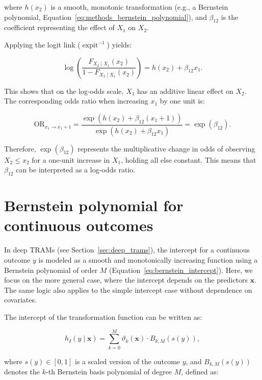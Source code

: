 where $h(x_2)$ is a smooth, monotonic transformation (e.g., a Bernstein polynomial, Equation~\ref{eq:methods_bernstein_polynomial}), and $\beta_{12}$ is the coefficient representing the effect of $X_1$ on $X_2$.

Applying the logit link ($\operatorname{expit}^{-1}$) yields:

\begin{equation*}
\log\left( \frac{F_{X_2 \mid X_1}(x_2)}{1 - F_{X_2 \mid X_1}(x_2)} \right)
= h(x_2) + \beta_{12} x_1.
\end{equation*}


This shows that on the log-odds scale, $X_1$ has an additive linear effect on $X_2$. The corresponding odds ratio when increasing $x_1$ by one unit is:

\begin{equation*}
\text{OR}_{x_1 \to x_1 + 1} = 
\frac{\exp(h(x_2) + \beta_{12}(x_1 + 1))}{\exp(h(x_2) + \beta_{12} x_1)} 
= \exp(\beta_{12}).
\end{equation*}

Therefore, $\exp(\beta_{12})$ represents the multiplicative change in odds of observing $X_2 \le x_2$ for a one-unit increase in $X_1$, holding all else constant. This means that $\beta_{12}$ can be interpreted as a log-odds ratio.





\section{Bernstein polynomial for continuous outcomes} \label{sec:bernstein_polynomial}

In deep TRAMs (see Section~\ref{sec:deep_trams}), the intercept for a continuous outcome $y$ is modeled as a smooth and monotonically increasing function using a Bernstein polynomial of order $M$ (Equation~\ref{eq:bernstein_intercept}). Here, we focus on the more general case, where the intercept depends on the predictors $\mathbf{x}$. The same logic also applies to the simple intercept case without dependence on covariates.

The intercept of the transformation function can be written as:

\begin{equation}
h_I(y \mid \mathbf{x}) = \sum_{k=0}^{M} \vartheta_k(\mathbf{x}) \cdot B_{k, M}(s(y)),
\label{eq:bernstein_intercept}
\end{equation}

where $s(y) \in [0, 1]$ is a scaled version of the outcome $y$, and $B_{k, M}(s(y))$ denotes the $k$-th Bernstein basis polynomial of degree $M$, defined as:

